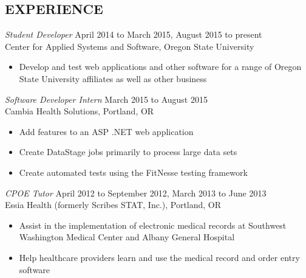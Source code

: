 \documentclass[margin]{res}
\begin{document}
\begin{resume}
\section{EXPERIENCE} {\sl Student Developer} \hfill April 2014 to                  March 2015, August 2015 to present \\
                Center for Applied Systems and Software, Oregon State University
                 \begin{itemize}  \itemsep -2pt %
                 \item Develop and test web applications and other software for a range of Oregon State University affiliates as well as other business

                \end{itemize}
 
                {\sl Software Developer Intern} \hfill            March 2015 to August 2015 \\
                Cambia Health Solutions, Portland, OR 
                 \begin{itemize}  \itemsep -2pt %
                 \item Add features to an ASP .NET web application
                 \item Create DataStage jobs primarily to process large data sets
                 \item Create automated tests using the FitNesse testing framework
                 \end{itemize} 
                {\sl CPOE Tutor} \hfill        
                April 2012 to September 2012, March 2013 to June 2013  \\
                Essia Health (formerly Scribes STAT, Inc.), Portland, OR
                  \begin{itemize}
                   \item Assist in the implementation of electronic medical records at Southwest Washington Medical Center and Albany General Hospital
                    \item Help healthcare providers learn and use the medical record and order entry software
                   \end{itemize} 
                   

\end{resume}
\end{document}
